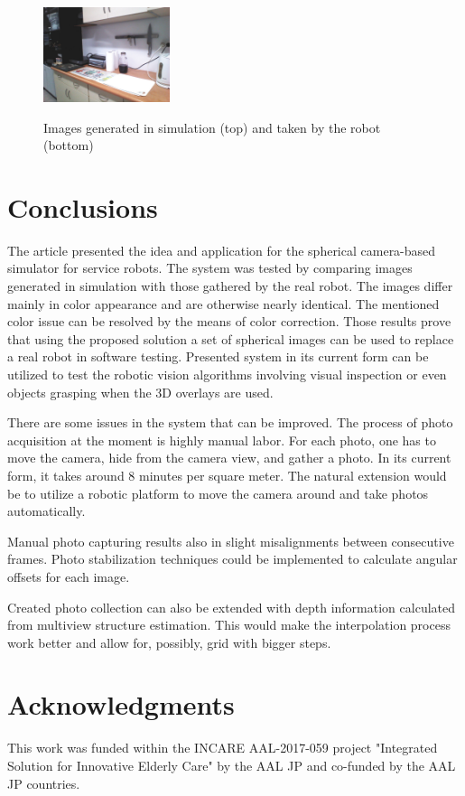 \documentclass{svproc}
\begin{document}
\begin{figure}[!ht]
    \includegraphics[width=0.33\textwidth]{img/sim_vs_tiago/tia_kuchnia_blat.jpg}\\
    \caption{Images generated in simulation (top) and taken by the robot (bottom)}
    \label{fig:sim_vs_tiago}
\end{figure}\vspace{-5mm}

\section{Conclusions}

The article presented the idea and application for the spherical camera-based 
simulator for service robots. The system was tested by comparing images generated in simulation
with those gathered by the real robot. The images differ mainly in color appearance 
and are otherwise nearly identical. The mentioned color issue can be resolved by the 
means of color correction. Those results prove that using the proposed solution a set 
of spherical images can be used to replace a real robot in software testing.
Presented system in its current form can be utilized to test the robotic vision algorithms
involving visual inspection \cite{mmar_winiarski_automated-2016} or even objects
grasping \cite{seredynski2016fast} when the 3D overlays are used.

There are some issues in the system that can be improved. The process of photo acquisition
at the moment is highly manual labor. For each photo, one has to move the camera, hide from
the camera view, and gather a photo. In its current form, it takes around 8 minutes per square meter.
The natural extension would be to utilize a robotic platform to move the camera around and
take photos automatically.

Manual photo capturing results also in slight misalignments between consecutive frames.
Photo stabilization techniques could be implemented to calculate angular offsets for each
image.

Created photo collection can also be extended with depth information calculated from multiview
structure estimation. This would make the interpolation process work better and allow for, 
possibly, grid with bigger steps.

\section*{Acknowledgments}
\label{sec:acknowledgments}
This work was funded within the INCARE AAL-2017-059 project "Integrated Solution for Innovative Elderly
Care" by the AAL JP and co-funded by the AAL JP countries.

 

\end{document}
